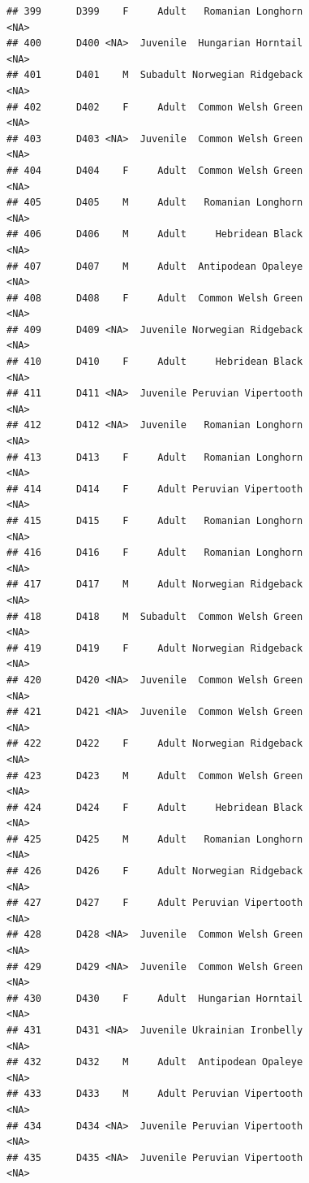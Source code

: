 \documentclass[
]{book}
\begin{document}
\begin{verbatim}
## 399      D399    F     Adult   Romanian Longhorn                <NA>
## 400      D400 <NA>  Juvenile  Hungarian Horntail                <NA>
## 401      D401    M  Subadult Norwegian Ridgeback                <NA>
## 402      D402    F     Adult  Common Welsh Green                <NA>
## 403      D403 <NA>  Juvenile  Common Welsh Green                <NA>
## 404      D404    F     Adult  Common Welsh Green                <NA>
## 405      D405    M     Adult   Romanian Longhorn                <NA>
## 406      D406    M     Adult     Hebridean Black                <NA>
## 407      D407    M     Adult  Antipodean Opaleye                <NA>
## 408      D408    F     Adult  Common Welsh Green                <NA>
## 409      D409 <NA>  Juvenile Norwegian Ridgeback                <NA>
## 410      D410    F     Adult     Hebridean Black                <NA>
## 411      D411 <NA>  Juvenile Peruvian Vipertooth                <NA>
## 412      D412 <NA>  Juvenile   Romanian Longhorn                <NA>
## 413      D413    F     Adult   Romanian Longhorn                <NA>
## 414      D414    F     Adult Peruvian Vipertooth                <NA>
## 415      D415    F     Adult   Romanian Longhorn                <NA>
## 416      D416    F     Adult   Romanian Longhorn                <NA>
## 417      D417    M     Adult Norwegian Ridgeback                <NA>
## 418      D418    M  Subadult  Common Welsh Green                <NA>
## 419      D419    F     Adult Norwegian Ridgeback                <NA>
## 420      D420 <NA>  Juvenile  Common Welsh Green                <NA>
## 421      D421 <NA>  Juvenile  Common Welsh Green                <NA>
## 422      D422    F     Adult Norwegian Ridgeback                <NA>
## 423      D423    M     Adult  Common Welsh Green                <NA>
## 424      D424    F     Adult     Hebridean Black                <NA>
## 425      D425    M     Adult   Romanian Longhorn                <NA>
## 426      D426    F     Adult Norwegian Ridgeback                <NA>
## 427      D427    F     Adult Peruvian Vipertooth                <NA>
## 428      D428 <NA>  Juvenile  Common Welsh Green                <NA>
## 429      D429 <NA>  Juvenile  Common Welsh Green                <NA>
## 430      D430    F     Adult  Hungarian Horntail                <NA>
## 431      D431 <NA>  Juvenile Ukrainian Ironbelly                <NA>
## 432      D432    M     Adult  Antipodean Opaleye                <NA>
## 433      D433    M     Adult Peruvian Vipertooth                <NA>
## 434      D434 <NA>  Juvenile Peruvian Vipertooth                <NA>
## 435      D435 <NA>  Juvenile Peruvian Vipertooth                <NA>

\end{verbatim}
\end{document}
